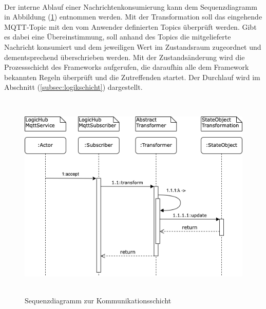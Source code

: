     \\
    Der interne Ablauf einer Nachrichtenkonsumierung kann dem Sequenzdiagramm in Abbildung (\ref{fig:kommunikationsequenz}) entnommen werden. Mit der Transformation 
    soll das eingehende \acs{MQTT}-Topic mit den vom Anwender definierten Topics überprüft werden. Gibt es dabei eine Übereinstimmung, soll anhand des Topics die mitgelieferte 
    Nachricht konsumiert und dem jeweiligen Wert im Zustandsraum zugeordnet und dementsprechend überschrieben werden. Mit der Zustandsänderung wird die 
    Prozessschicht des Frameworks aufgerufen, die daraufhin alle dem Framework bekannten Regeln überprüft und die Zutreffenden startet. Der Durchlauf wird im Abschnitt (\ref{subsec:logikschicht}) 
    dargestellt. 
    \begin{figure}[hbt!]
        \centering
        \includegraphics[width=14cm,height=10cm,keepaspectratio]{images/Kommunikationsschicht_Sequenz_Final.png}
        \caption{Sequenzdiagramm zur Kommunikationsschicht}
        \label{fig:kommunikationsequenz}
    \end{figure}

